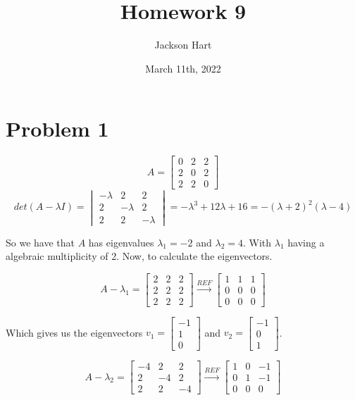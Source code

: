 \documentclass[12pt, letterpaper]{article}
\title{Homework 9}
\author{Jackson Hart}
\date{March 11th, 2022}
\begin{document}
\maketitle

\section*{Problem 1}

\[ A = \begin{bmatrix} 0 & 2 & 2 \\ 2 & 0 & 2 \\ 2 & 2 & 0 \end{bmatrix} \]
\[ det(A - \lambda I) = \begin{vmatrix} -\lambda & 2 & 2 \\ 2 & -\lambda & 2 \\ 2 & 2 & -\lambda \end{vmatrix} = -\lambda^3 + 12 \lambda + 16 = -(\lambda + 2)^2(\lambda - 4) \]

So we have that $A$ has eigenvalues $\lambda_1 = -2$ and $\lambda_2 = 4$. With $\lambda_1$ having a algebraic multiplicity of 2. Now, to calculate the eigenvectors. 

\[ A - \lambda_1 = \begin{bmatrix} 2 & 2 & 2 \\ 2 & 2 & 2 \\ 2 & 2 & 2 \end{bmatrix} \xrightarrow[]{REF} \begin{bmatrix} 1 & 1 & 1 \\ 0 & 0 & 0 \\ 0 & 0 & 0 \end{bmatrix} \]

Which gives us the eigenvectors $v_1 = \begin{bmatrix} -1 \\ 1 \\ 0 \end{bmatrix}$ and $v_2 = \begin{bmatrix} -1 \\ 0 \\ 1 \end{bmatrix}$. 

\[ A - \lambda_2 = \begin{bmatrix} -4 & 2 & 2 \\ 2 & -4 & 2 \\ 2 & 2 & -4 \end{bmatrix} \xrightarrow[]{REF} \begin{bmatrix} 1 & 0 & -1 \\ 0 & 1 & -1 \\ 0 & 0 & 0 \end{bmatrix} \] 
\end{document}
